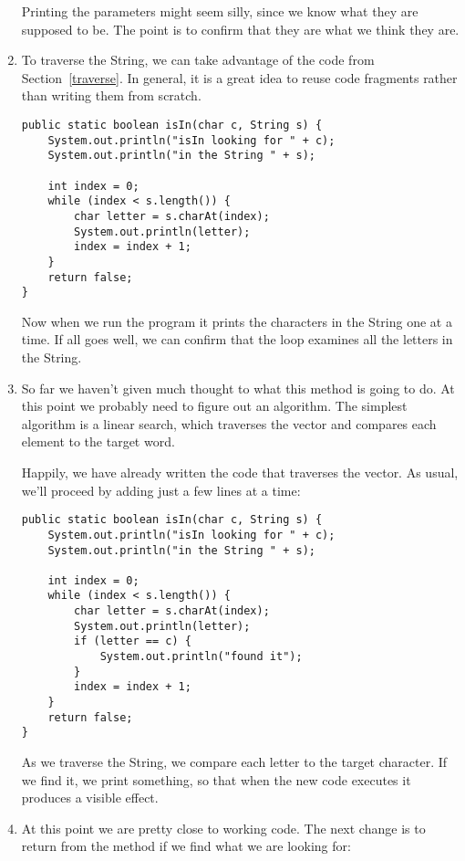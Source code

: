 \documentclass{book}
\begin{document}
\begin{enumerate}
Printing the parameters might seem silly, since we know what they
are supposed to be.  The point is to confirm that they are what we
think they are.


\item To traverse the String, we can take advantage of the code
from Section~\ref{traverse}.  In general, it is a great idea to
reuse code fragments rather than writing them from scratch.

\begin{verbatim}
public static boolean isIn(char c, String s) {
    System.out.println("isIn looking for " + c);
    System.out.println("in the String " + s);

    int index = 0;
    while (index < s.length()) {
        char letter = s.charAt(index);
        System.out.println(letter);
        index = index + 1;
    }
    return false;
}
\end{verbatim}

Now when we run the program it prints the characters in
the String one at a time.  
If all goes well, we can confirm that
the loop examines all the letters in the String.


\item So far we haven't given much thought to what this method
is going to do.  At this point we probably need to figure out an
algorithm.  The simplest algorithm is a linear search, which
traverses the vector and compares each element to the target word.

Happily, we have already written the code that traverses the
vector.  As usual, we'll proceed by adding just a few lines
at a time:

\begin{verbatim}
public static boolean isIn(char c, String s) {
    System.out.println("isIn looking for " + c);
    System.out.println("in the String " + s);

    int index = 0;
    while (index < s.length()) {
        char letter = s.charAt(index);
        System.out.println(letter);
        if (letter == c) {
            System.out.println("found it");
        }
        index = index + 1;
    }
    return false;
}
\end{verbatim}

As we traverse the String, we compare each letter to the target
character.  If we find it, we print something, so
that when the new code executes it produces a visible effect.

\item At this point we are pretty close to working code.  The
next change is to return from the method if we find what we are
looking for:


\end{enumerate}
\end{document}
